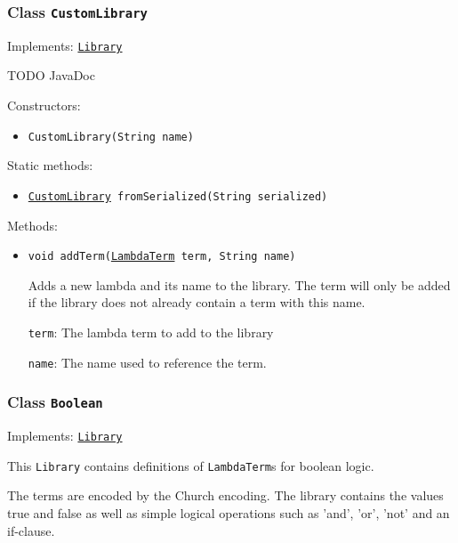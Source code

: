 \subsubsection{Class \texttt{CustomLibrary}}
\label{type:edu.kit.wavelength.client.model.library.CustomLibrary}
Implements: \texttt{\hyperref[type:edu.kit.wavelength.client.model.library.Library]{Library}}

TODO JavaDoc

Constructors:
\begin{itemize}
\item \texttt{CustomLibrary(String name)}



\end{itemize}

Static methods:
\begin{itemize}
\item \texttt{\hyperref[type:edu.kit.wavelength.client.model.library.CustomLibrary]{CustomLibrary} fromSerialized(String serialized)}



\end{itemize}

Methods:
\begin{itemize}
\item \texttt{void addTerm(\hyperref[type:edu.kit.wavelength.client.model.term.LambdaTerm]{LambdaTerm} term, String name)}

Adds a new lambda and its name to the library. 
 The term will only be added if  the library does not already contain a term with this name.

\texttt{term}: The lambda term to add to the library

\texttt{name}: The name used to reference the term.

\end{itemize}

\subsubsection{Class \texttt{Boolean}}
\label{type:edu.kit.wavelength.client.model.library.Boolean}
Implements: \texttt{\hyperref[type:edu.kit.wavelength.client.model.library.Library]{Library}}

This \texttt{Library} contains definitions of \texttt{LambdaTerm}s for boolean logic.
 
 The terms are encoded by the Church encoding. The library contains the values true and 
 false as well as simple logical operations such as 'and', 'or', 'not' and an if-clause.

